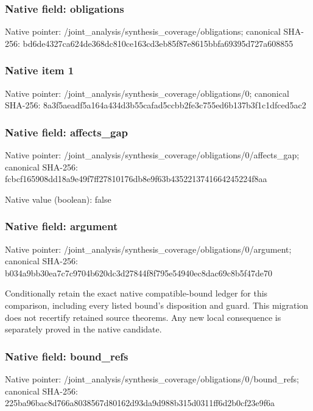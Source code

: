 \documentclass[10pt,a4paper]{article}
\begin{document}
\subsubsection{Native field: obligations}
Native pointer: /joint\_\allowbreak{}analysis/synthesis\_\allowbreak{}coverage/obligations; canonical SHA-256: bd6de4327ca624de368dc810ce163cd3eb85f87e8615bbfa69395d727a608855

\subsubsection{Native item 1}
Native pointer: /joint\_\allowbreak{}analysis/synthesis\_\allowbreak{}coverage/obligations/0; canonical SHA-256: 8a3f5aeadf5a164a434d3b55cafad5ccbb2fe3c755ed6b137b3f1c1dfced5ac2

\subsubsection{Native field: affects\_\allowbreak{}gap}
Native pointer: /joint\_\allowbreak{}analysis/synthesis\_\allowbreak{}coverage/obligations/0/affects\_\allowbreak{}gap; canonical SHA-256: fcbcf165908dd18a9e49f7ff27810176db8e9f63b4352213741664245224f8aa

Native value (boolean): false

\subsubsection{Native field: argument}
Native pointer: /joint\_\allowbreak{}analysis/synthesis\_\allowbreak{}coverage/obligations/0/argument; canonical SHA-256: b034a9bb30ea7c7c9704b620dc3d27844f8f795e54940ec8dac69c8b5f47de70

\begingroup\raggedright\sloppy Conditionally retain the exact native compatible-bound ledger for this comparison,\allowbreak{} including every listed bound's disposition and guard. This migration does not recertify retained source theorems. Any new local consequence is separately proved in the native candidate.\par\endgroup

\subsubsection{Native field: bound\_\allowbreak{}refs}
Native pointer: /joint\_\allowbreak{}analysis/synthesis\_\allowbreak{}coverage/obligations/0/bound\_\allowbreak{}refs; canonical SHA-256: 225ba96bac8d766a8038567d80162d93da9d988b315d0311ff6d2b0cf23e9f6a
\end{document}
